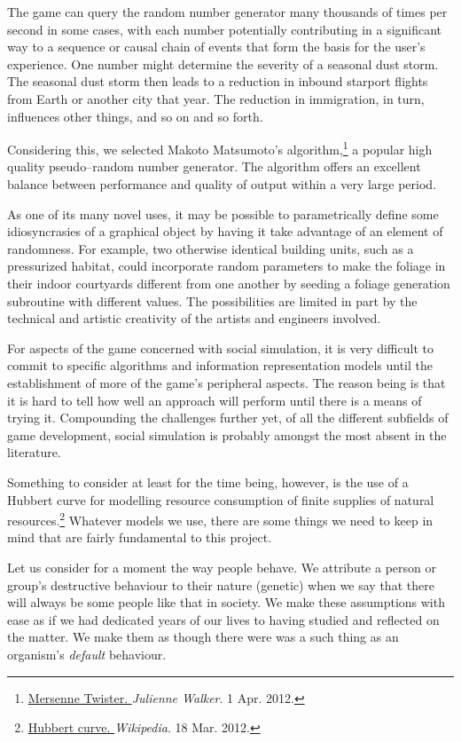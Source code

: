 The game can query the random number generator many thousands of times per second in some cases, with each number potentially contributing in a significant way to a sequence or causal chain of events that form the basis for the user's experience. One number might determine the severity of a seasonal dust storm. The seasonal dust storm then leads to a reduction in inbound starport flights from Earth or another city that year. The reduction in immigration, in turn, influences other things, and so on and so forth.

Considering this, we selected Makoto Matsumoto's algorithm,\footnote{\href{http://www.eternallyconfuzzled.com/tuts/algorithms/jsw_tut_rand.aspx\#mersenne}{Mersenne Twister. }{\it Julienne Walker}. 1 Apr. 2012.} a popular high quality pseudo--random number generator. The algorithm offers an excellent balance between performance and quality of output within a very large period.

As one of its many novel uses, it may be possible to parametrically define some idiosyncrasies of a graphical object by having it take advantage of an element of randomness. For example, two otherwise identical building units, such as a pressurized habitat, could incorporate random parameters to make the foliage in their indoor courtyards different from one another by seeding a foliage generation subroutine with different values. The possibilities are limited in part by the technical and artistic creativity of the artists and engineers involved.

For aspects of the game concerned with social simulation, it is very difficult to commit to specific algorithms and information representation models until the establishment of more of the game's peripheral aspects. The reason being is that it is hard to tell how well an approach will perform until there is a means of trying it. Compounding the challenges further yet, of all the different subfields of game development, social simulation is probably amongst the most absent in the literature.

Something to consider at least for the time being, however, is the use of a Hubbert curve for modelling resource consumption of finite supplies of natural resources.\footnote{\href{https://en.wikipedia.org/wiki/Hubbert_curve}{Hubbert curve. }{\it Wikipedia}. 18 Mar. 2012.} Whatever models we use, there are some things we need to keep in mind that are fairly fundamental to this project. 

Let us consider for a moment the way people behave. We attribute a person or group's destructive behaviour to their nature (genetic) when we say that there will always be some people like that in society. We make these assumptions with ease as if we had dedicated years of our lives to having studied and reflected on the matter. We make them as though there were was a such thing as an organism's {\it default} behaviour.

